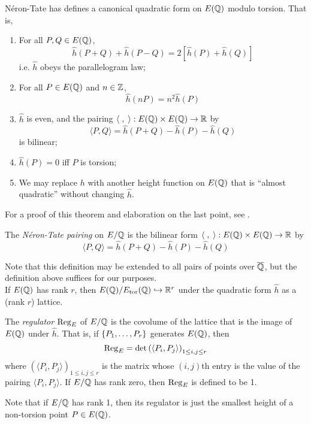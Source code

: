 \begin{theorem}
N\'eron-Tate has defines a canonical quadratic form on $E(\mathbb{Q})$ modulo torsion. That is,
\begin{enumerate}
	\item For all $P,Q \in E(\mathbb{Q})$,
	\begin{equation}
		\hat{h}(P+Q) + \hat{h}(P-Q) = 2\left[ \hat{h}(P) + \hat{h}(Q)\right]
	\end{equation}
	i.e. $\hat{h}$ obeys the parallelogram law;
	\item For all $P \in E(\mathbb{Q})$ and $n \in \mathbb{Z}$,
	\begin{equation}
		\hat{h}(nP) = n^2 \hat{h}(P)
	\end{equation}
	\item $\hat{h}$ is even, and the pairing $\langle\;,\;\rangle: E(\mathbb{Q})\times E(\mathbb{Q}) \to \mathbb{R}$ by
	\begin{equation}
		\langle P,Q \rangle = \hat{h}(P+Q) - \hat{h}(P) - \hat{h}(Q)
	\end{equation}
	is bilinear;
	\item $\hat{h}(P) = 0$ iff $P$ is torsion;
	\item We may replace $h$ with another height function on $E(\mathbb{Q})$ that is ``almost quadratic'' without changing $\hat{h}$.
\end{enumerate}
\end{theorem}

For a proof of this theorem and elaboration on the last point, see \cite[pp. 227-232]{Sil-1985}.

\begin{definition}
The {\it N\'eron-Tate pairing} on $E/\mathbb{Q}$ is the bilinear form $\langle\;,\;\rangle: E(\mathbb{Q})\times E(\mathbb{Q}) \to \mathbb{R}$ by
	\begin{equation}
		\langle P,Q \rangle = \hat{h}(P+Q) - \hat{h}(P) - \hat{h}(Q)
	\end{equation}
\end{definition}
Note that this definition may be extended to all pairs of points over $\overline{\mathbb{Q}}$, but the definition above suffices for our purposes. \\

If $E(\mathbb{Q})$ has rank $r$, then $E(\mathbb{Q})/E_{\text{tor}}(\mathbb{Q}) \hookrightarrow \mathbb{R}^r$ under the quadratic form $\hat{h}$ as a (rank $r$) lattice.

\begin{definition}
The {\it regulator} $\operatorname{Reg}_E$ of $E/\mathbb{Q}$ is the covolume of the lattice that is the image of $E(\mathbb{Q})$ under $\hat{h}$. That is, if $\left\{P_1,\ldots,P_r\right\}$ generates $E(\mathbb{Q})$, then
\begin{equation}
	\operatorname{Reg}_E = \det\left(\langle P_i,P_j\rangle \right)_{1 \le i,j \le r}
\end{equation}
where $\left(\langle P_i,P_j\rangle \right)_{1 \le i,j \le r}$ is the matrix whose $(i,j)$th entry is the value of the pairing $\langle P_i,P_j\rangle$. If $E/\mathbb{Q}$ has rank zero, then $\operatorname{Reg}_E$ is defined to be 1.
\end{definition}
Note that if $E/\mathbb{Q}$ has rank 1, then its regulator is just the smallest height of a non-torsion point $P \in E(\mathbb{Q})$. \\

